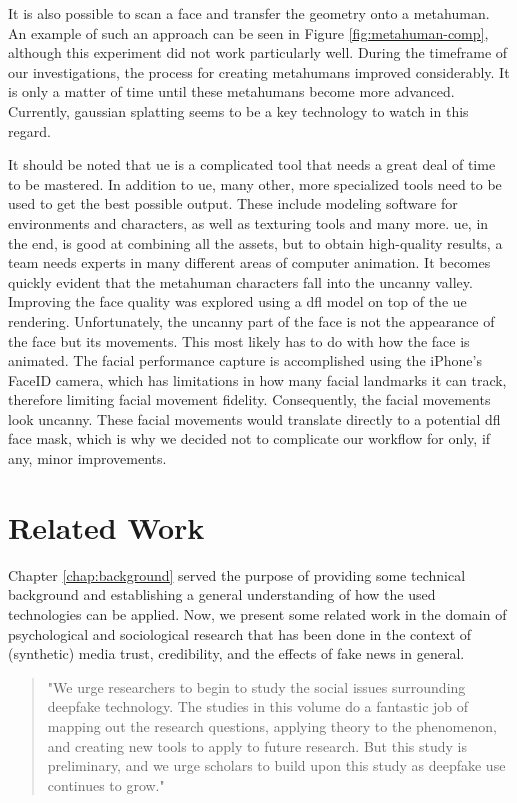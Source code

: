 \documentclass[
  a4paper,  %
  twoside,  %
  bibliography=totoc,
  headsepline,
  cleardoublepage=empty,
  parskip=half,
  draft=false
]{scrbook}
\begin{document}
It is also possible to scan a face and transfer the geometry onto a metahuman. An example of such an approach can be seen in Figure \ref{fig:metahuman-comp}, although this experiment did not work particularly well. During the timeframe of our investigations, the process for creating metahumans improved considerably. It is only a matter of time until these metahumans become more advanced. Currently, gaussian splatting seems to be a key technology to watch in this regard.

It should be noted that \gls{ue} is a complicated tool that needs a great deal of time to be mastered. In addition to \gls{ue}, many other, more specialized tools need to be used to get the best possible output. These include modeling software for environments and characters, as well as texturing tools and many more. \gls{ue}, in the end, is good at combining all the assets, but to obtain high-quality results, a team needs experts in many different areas of computer animation. It becomes quickly evident that the metahuman characters fall into the uncanny valley. Improving the face quality was explored using a \gls{dfl} model on top of the \gls{ue} rendering. Unfortunately, the uncanny part of the face is not the appearance of the face but its movements. This most likely has to do with how the face is animated. The facial performance capture is accomplished using the iPhone's FaceID camera, which has limitations in how many facial landmarks it can track, therefore limiting facial movement fidelity. Consequently, the facial movements look uncanny. These facial movements would translate directly to a potential \gls{dfl} face mask, which is why we decided not to complicate our workflow for only, if any, minor improvements.

\chapter{Related Work}
\label{chap:rel-work}
Chapter \ref{chap:background} served the purpose of providing some technical background and establishing a general understanding of how the used technologies can be applied. Now, we present some related work in the domain of psychological and sociological research that has been done in the context of (synthetic) media trust, credibility, and the effects of fake news in general. 

\begin{quotation}
  "We urge researchers to begin to study the social issues surrounding deepfake technology. The studies in this volume do a fantastic job of mapping out the research questions, applying theory to the phenomenon, and creating new tools to apply to future research. But this study is preliminary, and we urge scholars to build upon this study as deepfake use continues to grow." \cite{hancockSocialImpactDeepfakes2021}
\end{quotation}
\end{document}
